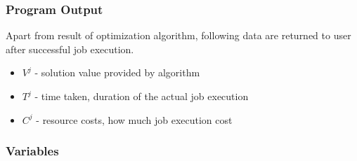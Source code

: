 \subsubsection{Program Output}
Apart from result of optimization algorithm,
following data are returned to user after successful job execution.

\begin{itemize}
	\item $V^{j}$ - solution value provided by algorithm
	\item $T^{j}$ - time taken, duration of the actual job execution
	\item $C^{j}$ - resource costs, how much job execution cost
\end{itemize}

\subsubsection{Variables}

